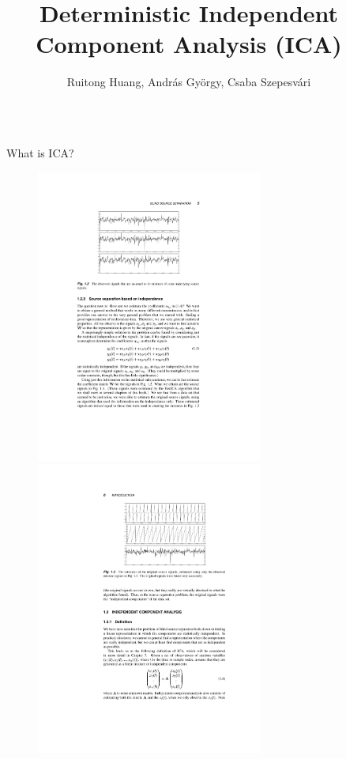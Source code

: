 \documentclass[final]{beamer} %
\title{Deterministic Independent Component Analysis (ICA)}
\author{Ruitong Huang, Andr\'as Gy\"orgy, Csaba Szepesv\'{a}ri}
\begin{document}
\begin{frame}[c]
	\vspace{-1.5cm}

	\begin{columns}[t,totalwidth=\textwidth]
	
	\begin{column}{0.01\textwidth}
	\end{column}
 	\begin{column}{.32\textwidth}%
	
		\begin{block}{What is ICA?}
			\begin{figure}
				\includegraphics[width=0.7\textwidth]{ICABOOK2001_ObservedSignals} \\
				\includegraphics[width=0.7\textwidth]{ICABOOK2001_ReconstructedSignals}

\end{figure}
\end{block}
\end{column}
\end{columns}
\end{frame}
\end{document}
